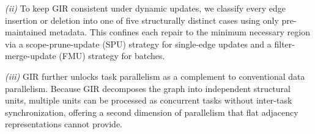 \textit{(ii)} To keep GIR consistent under dynamic updates, we classify every edge insertion or deletion into one of five structurally distinct cases using only pre-maintained metadata. This confines each repair to the minimum necessary region via a scope-prune-update (SPU) strategy for single-edge updates and a filter-merge-update (FMU) strategy for batches.


\textit{(iii)} GIR further unlocks task parallelism as a complement to conventional data parallelism. Because GIR decomposes the graph into independent structural units, multiple units can be processed as concurrent tasks without inter-task synchronization, offering a second dimension of parallelism that flat adjacency representations cannot provide.





